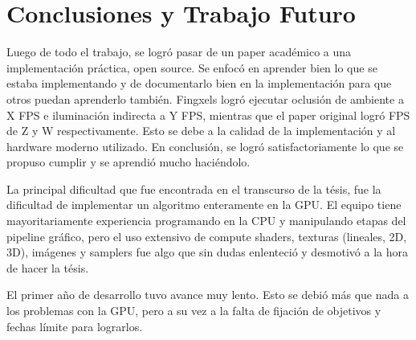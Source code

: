 \graphicspath{{chapters/6_conclusión/figures/}}

\chapter{Conclusiones y Trabajo Futuro}\label{chap:conclusions}

Luego de todo el trabajo, se logró pasar de un paper académico a una implementación práctica, open source.
Se enfocó en aprender bien lo que se estaba implementando y de documentarlo bien en la implementación para que otros puedan aprenderlo también.
Fingxels logró ejecutar oclusión de ambiente a X FPS e iluminación indirecta a Y FPS, mientras que el paper original logró FPS de Z y W respectivamente.
Esto se debe a la calidad de la implementación y al hardware moderno utilizado. %
En conclusión, se logró satisfactoriamente lo que se propuso cumplir y se aprendió mucho haciéndolo.

La principal dificultad que fue encontrada en el transcurso de la tésis, fue la dificultad de implementar un algoritmo enteramente en la GPU.
El equipo tiene mayoritariamente experiencia programando en la CPU y manipulando etapas del pipeline gráfico, pero el uso extensivo de compute shaders, texturas (lineales, 2D, 3D), imágenes y samplers fue algo que sin dudas enlenteció y desmotivó a la hora de hacer la tésis.

El primer año de desarrollo tuvo avance muy lento.
Esto se debió más que nada a los problemas con la GPU, pero a su vez a la falta de fijación de objetivos y fechas límite para lograrlos.

